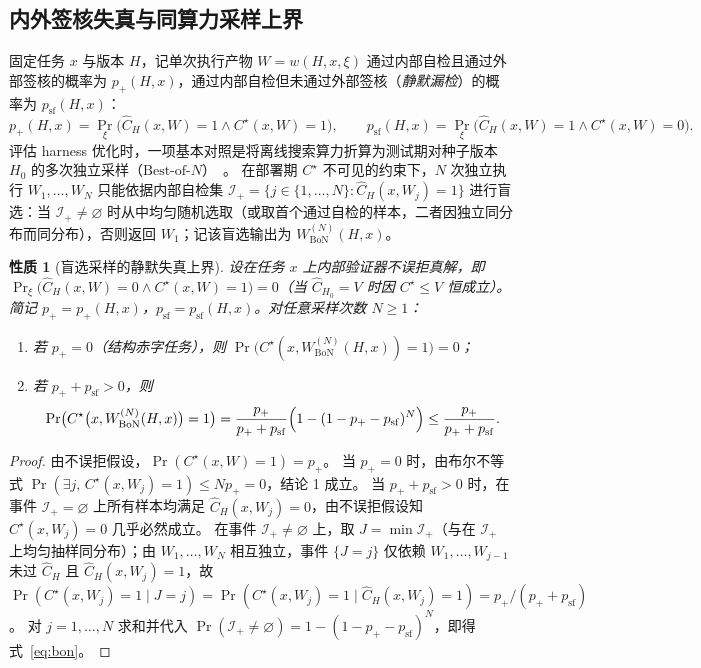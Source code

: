 \documentclass[UTF8,a4paper,10.5pt]{ctexart}
\newtheorem{prop}{性质}
\begin{document}
\subsection{内外签核失真与同算力采样上界}
\label{sec:alignment}

固定任务 $x$ 与版本 $H$，记单次执行产物 $W=w(H,x,\xi)$ 通过内部自检且通过外部签核的概率为 $p_+(H,x)$，通过内部自检但未通过外部签核（\emph{静默漏检}）的概率为 $p_{\mathrm{sf}}(H,x)$：
\begin{equation}
  p_+(H,x) = \Pr_\xi\bigl(\hat{C}_H(x,W)=1 \land C^\star(x,W)=1\bigr),\qquad
  p_{\mathrm{sf}}(H,x) = \Pr_\xi\bigl(\hat{C}_H(x,W)=1 \land C^\star(x,W)=0\bigr).
\end{equation}
评估 harness 优化时，一项基本对照是将离线搜索算力折算为测试期对种子版本 $H_0$ 的多次独立采样（$\text{Best-of-}N$）~\cite{rethinking}。
在部署期 $C^\star$ 不可见的约束下，$N$ 次独立执行 $W_1,\dots,W_N$ 只能依据内部自检集 $\mathcal{I}_+=\{j\in\{1,\dots,N\}:\hat{C}_H(x,W_j)=1\}$ 进行盲选：当 $\mathcal{I}_+\neq\varnothing$ 时从中均匀随机选取（或取首个通过自检的样本，二者因独立同分布而同分布），否则返回 $W_1$；记该盲选输出为 $W^{(N)}_{\mathrm{BoN}}(H,x)$。

\begin{prop}[盲选采样的静默失真上界]
\label{prop:bon}
设在任务 $x$ 上内部验证器不误拒真解，即 $\Pr_\xi\bigl(\hat{C}_H(x,W)=0 \land C^\star(x,W)=1\bigr)=0$（当 $\hat{C}_{H_0}=V$ 时因 $C^\star\le V$ 恒成立）。简记 $p_+=p_+(H,x)$，$p_{\mathrm{sf}}=p_{\mathrm{sf}}(H,x)$。对任意采样次数 $N\ge 1$：
\begin{enumerate}
  \item 若 $p_+=0$（结构赤字任务），则 $\Pr\bigl(C^\star(x, W^{(N)}_{\mathrm{BoN}}(H,x))=1\bigr) = 0$；
  \item 若 $p_++p_{\mathrm{sf}}>0$，则
  \begin{equation}
    \Pr\bigl(C^\star\bigl(x, W^{(N)}_{\mathrm{BoN}}(H,x)\bigr)=1\bigr)
    = \frac{p_+}{p_++p_{\mathrm{sf}}}\Bigl(1 - (1 - p_+ - p_{\mathrm{sf}})^N\Bigr)
    \le \frac{p_+}{p_++p_{\mathrm{sf}}}.
    \label{eq:bon}
  \end{equation}
\end{enumerate}
\end{prop}
\begin{proof}
由不误拒假设，$\Pr(C^\star(x,W)=1)=p_+$。
当 $p_+=0$ 时，由布尔不等式 $\Pr(\exists j,\,C^\star(x,W_j)=1)\le N p_+=0$，结论 1 成立。
当 $p_++p_{\mathrm{sf}}>0$ 时，在事件 $\mathcal{I}_+=\varnothing$ 上所有样本均满足 $\hat{C}_H(x,W_j)=0$，由不误拒假设知 $C^\star(x,W_j)=0$ 几乎必然成立。
在事件 $\mathcal{I}_+\neq\varnothing$ 上，取 $J=\min\mathcal{I}_+$（与在 $\mathcal{I}_+$ 上均匀抽样同分布）；由 $W_1,\dots,W_N$ 相互独立，事件 $\{J=j\}$ 仅依赖 $W_1,\dots,W_{j-1}$ 未过 $\hat{C}_H$ 且 $\hat{C}_H(x,W_j)=1$，故
$\Pr(C^\star(x,W_j)=1\mid J=j)=\Pr(C^\star(x,W_j)=1\mid \hat{C}_H(x,W_j)=1)=p_+/(p_++p_{\mathrm{sf}})$。
对 $j=1,\dots,N$ 求和并代入 $\Pr(\mathcal{I}_+\neq\varnothing)=1-(1-p_+-p_{\mathrm{sf}})^N$，即得式~\eqref{eq:bon}。
\end{proof}
\end{document}
